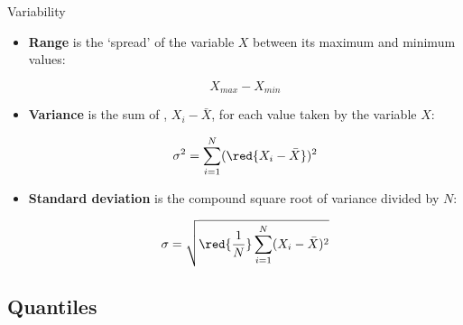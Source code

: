 \documentclass{beamer}
\begin{document}
	\begin{frame}[t]{Variability}

	\begin{itemize}
		\item \textbf{Range} is the `spread' of the variable $X$ between its maximum and minimum values: 
		
		\vspace{-1em}
		$$X_{max} - X_{min}$$
		
		\item \textbf{Variance} is the sum of , $X_i - \bar X$, for each value taken by the variable $X$:
		
		\vspace{-1em}
		$$\sigma^2 = \sum_{i=1}^N (\red{X_i - \bar X})^2$$
		
		\item \textbf{Standard deviation} is the compound square root of variance divided by  $N$:

		\vspace{-1em}
		$$\sigma = \sqrt{\red{\frac{1}{N}} \sum_{i=1}^N (X_i - \bar X)^2}$$
	\end{itemize}
	
	\end{frame}

	\subsection{Quantiles}
	
\end{document}
